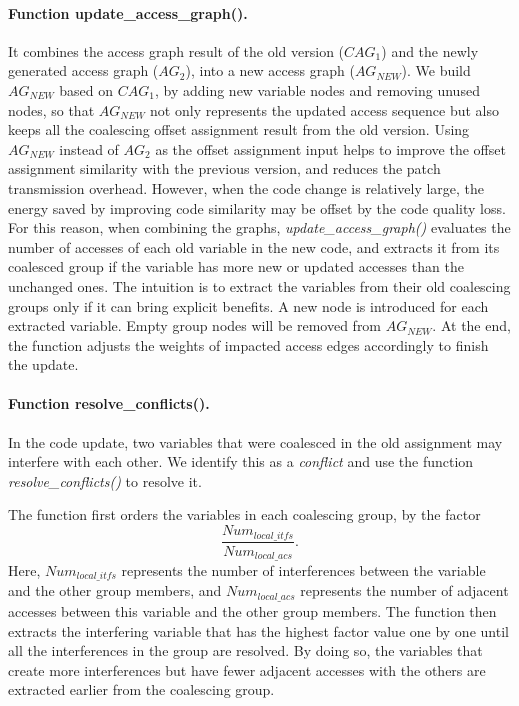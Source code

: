 \paragraph{Function  update\_access\_graph().} It combines the access graph result of the old version 
($\textit{CAG}_1$) and the newly generated access graph ($\textit{AG}_2$), into a new access graph 
($\textit{AG}_\textit{NEW}$).
We build $\textit{AG}_\textit{NEW}$ based on $\textit{CAG}_1$, by adding new variable nodes and removing unused nodes, 
so that
$\textit{AG}_\textit{NEW}$ not only represents the updated access sequence but also keeps all the coalescing offset 
assignment result from the old version.
Using $\textit{AG}_\textit{NEW}$ instead of $\textit{AG}_2$ as the offset assignment input helps to improve the offset 
assignment similarity with the previous version, and reduces the patch transmission overhead.
However, when the code change is relatively large, the energy saved by improving code similarity may be offset by the 
code quality loss. 
For this reason, when combining the graphs, {\it update\_access\_graph()} evaluates the number of accesses of each old 
variable in the new code, and extracts it from its coalesced group if the variable has more new or updated accesses 
than the unchanged ones. 
The intuition is to extract the variables from their old coalescing groups only if it can bring explicit benefits. 
A new node is introduced for each extracted variable. Empty group nodes will be removed from $\textit{AG}_\textit{NEW}$.
At the end, the function adjusts the weights of impacted access edges accordingly to finish the update.


\paragraph{Function resolve\_conflicts().}In the code update, two variables that were coalesced in the old assignment 
may interfere with each other. We identify this as a {\em conflict} and use the function {\it resolve\_conflicts()} to 
resolve it. 

The function first orders the variables in each coalescing group, by the factor 
$$\frac{\textit{Num}_{\textit{local}\_\textit{itfs}}}{\textit{Num}_{\textit{local}\_\textit{acs}}} .$$
Here, $\textit{Num}_{\textit{local}\_\textit{itfs}}$ represents the number of interferences between the variable and 
the other group members, and $\textit{Num}_{\textit{local}\_\textit{acs}}$ represents the number of adjacent accesses 
between this variable and the other group members. The function then extracts the interfering variable that has the 
highest factor value one by one until all the interferences in the group are resolved. By doing so, the variables that 
create more interferences but have fewer adjacent accesses with the others are extracted earlier from the coalescing 
group. 

